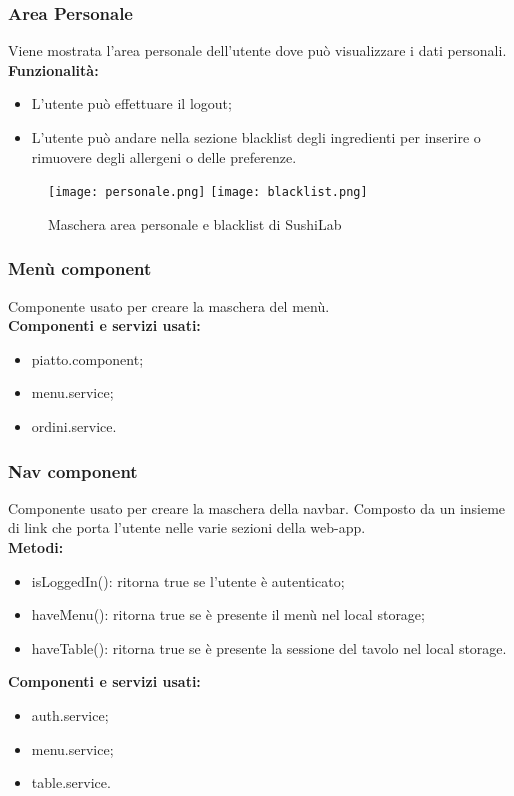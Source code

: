 \subsubsection{Area Personale}
Viene mostrata l'area personale dell'utente dove può visualizzare i dati personali.
\textbf{Funzionalità:}
\begin{itemize}
    \item L'utente può effettuare il logout;
    \item L'utente può andare nella sezione blacklist degli ingredienti per inserire o rimuovere degli allergeni o delle preferenze.
\end{itemize}
\begin{figure}[H]
    \centering
    \texttt{[image: personale.png]}
    \texttt{[image: blacklist.png]}
    \caption{Maschera area personale e blacklist di SushiLab}
\end{figure}
\label{cap:menu.component}

\subsubsection{Menù component}
Componente usato per creare la maschera del menù.\\
\textbf{Componenti e servizi usati:}
\begin{itemize}
    \item piatto.component;
    \item menu.service;
    \item ordini.service.
\end{itemize}

\subsubsection{Nav component}
Componente usato per creare la maschera della navbar. Composto da un insieme di link che porta l'utente nelle varie sezioni della web-app.\\
\textbf{Metodi:}
\begin{itemize}
    \item isLoggedIn(): ritorna true se l'utente è autenticato;
    \item haveMenu(): ritorna true se è presente il menù nel local storage;
    \item haveTable(): ritorna true se è presente la sessione del tavolo nel local storage.
\end{itemize}
\textbf{Componenti e servizi usati:}
\begin{itemize}    
    \item auth.service;
    \item menu.service;
    \item table.service.
\end{itemize}

